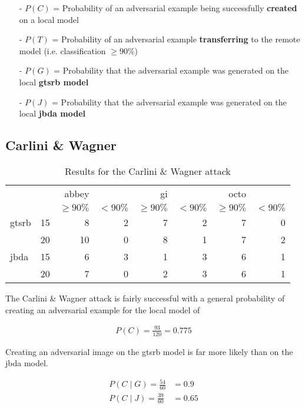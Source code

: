 \begin{itemize}
\item[-] $P(C)$ = Probability of an adversarial example being successfully \textbf{created} on a local model
\item[-] $P(T)$ = Probability of an adversarial example \textbf{transferring} to the remote model (i.e. classification $\geq90\%$)
\item[-] $P(G)$ = Probability that the adversarial example was generated on the local \textbf{gtsrb model}
\item[-] $P(J)$ = Probability that the adversarial example was generated on the local \textbf{jbda model}
\end{itemize}

\subsection{Carlini \& Wagner}


\begin{table}
\begin{tabular}{l l | r r | r r | r r}
& & abbey & & gi & & octo & \\[1ex]
& & \footnotesize$\geq90\%$ & \footnotesize$<90\%$ & \footnotesize$\geq90\%$ & \footnotesize$<90\%$ & \footnotesize$\geq90\%$ & \footnotesize$<90\%$ \\[1ex]
\hline
gtsrb & 15 & 8 & 2 & 7 & 2 & 7 & 0 \\[1ex]
& 20 & 10 & 0 & 8 & 1 & 7 & 2 \\[1ex]
\hline
jbda & 15 & 6 & 3 & 1 & 3 & 6 & 1 \\[1ex]
& 20 & 7 & 0 & 2 & 3 & 6 & 1
\end{tabular}
\caption{Results for the Carlini \& Wagner attack}
\label{tab:cwl2_result}
\end{table}

The Carlini \& Wagner attack is fairly successful with a general probability of creating an adversarial example for the local model of

\begin{align*}
P(C) = \frac{93}{120} = 0.775
\end{align*}

Creating an adversarial image on the gtsrb model is far more likely than on the jbda model.

\begin{align*}
P(C \mid G) = \frac{54}{60} &= 0.9\\[1ex]
P(C \mid J) = \frac{39}{60} &= 0.65
\end{align*}

